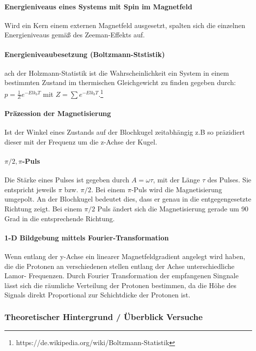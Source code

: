 \documentclass[12pt,oneside,oldfontcommands]{memoir}
\begin{document}
\paragraph{Energieniveaus eines Systems mit Spin im Magnetfeld}
Wird ein Kern einem externen Magnetfeld ausgesetzt, spalten sich die einzelnen Energieniveaus gemäß des Zeeman-Effekts auf.

\paragraph{Energieniveaubesetzung (Boltzmann-Ststistik)}
ach der Holzmann-Statistik ist die Wahrscheinlichkeit ein System in einem bestimmten Zustand im thermischen Gleichgewicht zu finden gegeben durch:$p = \frac{1}{Z} e^{-Elk_bT}$ mit $Z = \sum e^{-Elk_bT}.$\footnote{https://de.wikipedia.org/wiki/Boltzmann-Statistik}


\paragraph{Präzession der Magnetisierung}
Ist der Winkel eines Zustands auf der Blochkugel zeitabhängig z.B so präzidiert dieser mit der Frequenz 
um die z-Achse der Kugel. 

\paragraph{$\pi / 2, \pi$-Puls}
Die Stärke eines Pulses ist gegeben durch $A=\omega \tau$, mit der Länge $\tau$ des Pulses. Sie entspricht jeweils $\pi$ bzw. $\pi/2$. Bei einem $\pi$-Puls wird die Magnetisierung umgepolt. An der Blochkugel bedeutet dies, dass er genau in die entgegengesetzte Richtung zeigt. Bei einem $\pi/2$ Puls ändert sich die Magnetisierung gerade um 90 Grad in die entsprechende Richtung.

\paragraph{1-D Bildgebung mittels Fourier-Transformation}
Wenn entlang der y-Achse ein linearer Magnetfeldgradient angelegt wird haben, die die Protonen an verschiedenen stellen entlang der Achse unterschiedliche Lamor-
Frequenzen. Durch Fourier Transformation der empfangenen Singnale lässt sich die räumliche Verteilung der Protonen bestimmen, da die Höhe des Signals direkt Proportional zur Schichtdicke der Protonen ist.

\subsubsection{Theoretischer Hintergrund / Überblick Versuche}
\end{document}
